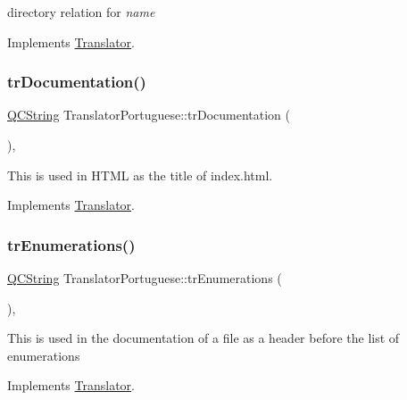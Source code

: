 directory relation for {\itshape name} 

Implements \mbox{\hyperlink{class_translator}{Translator}}.

\mbox{\label{class_translator_portuguese_afa49d1abe37028f7b3defd3f067157ed}} 
\subsubsection{\texorpdfstring{trDocumentation()}{trDocumentation()}}
{\footnotesize\ttfamily \mbox{\hyperlink{class_q_c_string}{Q\+C\+String}} Translator\+Portuguese\+::tr\+Documentation (\begin{DoxyParamCaption}{ }\end{DoxyParamCaption})\hspace{0.3cm}{\ttfamily [inline]}, {\ttfamily [virtual]}}

This is used in H\+T\+ML as the title of index.\+html. 

Implements \mbox{\hyperlink{class_translator}{Translator}}.

\mbox{\label{class_translator_portuguese_a7a37ccb3c92adb7c0f9e6853462198f6}} 
\subsubsection{\texorpdfstring{trEnumerations()}{trEnumerations()}}
{\footnotesize\ttfamily \mbox{\hyperlink{class_q_c_string}{Q\+C\+String}} Translator\+Portuguese\+::tr\+Enumerations (\begin{DoxyParamCaption}{ }\end{DoxyParamCaption})\hspace{0.3cm}{\ttfamily [inline]}, {\ttfamily [virtual]}}

This is used in the documentation of a file as a header before the list of enumerations 

Implements \mbox{\hyperlink{class_translator}{Translator}}.

\mbox{\label{class_translator_portuguese_ae3ce12563127799cd09934f433cf678a}} 
